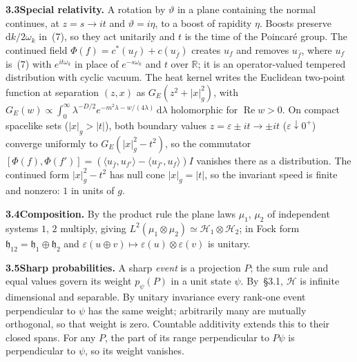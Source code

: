 \documentclass[10pt,a4paper]{article}
\newcommand{\dd}{\mathrm{d}}
\newcommand{\R}{\mathbb{R}}
\newcommand{\hh}{\mathfrak{h}}
\newcommand{\HH}{\mathcal{H}}
\newcommand{\RePart}{\operatorname{Re}}
\begin{document}
\newpage
\setlength{\intextsep}{7pt plus 2pt minus 2pt}
\noindent\textbf{3.3\enspace Special relativity.} A rotation by $\vartheta$ in a plane containing the normal continues, at $z = s \to it$ and $\vartheta = i\eta$, to a boost of rapidity $\eta$. Boosts preserve $\dd k/2\omega_k$ in~(7), so they act unitarily and $t$ is the time of the Poincar\'e group. The continued field $\Phi(f) = c^*(u_f) + c(u_{\bar{f}})$ creates $u_f$ and removes $u_{\bar{f}}$, where $u_f$ is~(7) with $e^{it\omega_k}$ in place of $e^{-s\omega_k}$ and $t$ over $\R$; it is an operator-valued tempered distribution with cyclic vacuum. The heat kernel writes the Euclidean two-point function at separation $(z, x)$ as $G_E(z^2 + |x|_g^2)$, with $G_E(w) \propto \int_0^\infty \lambda^{-D/2} e^{-m^2\lambda - w/(4\lambda)}\,\dd\lambda$ holomorphic for $\RePart w > 0$. On compact spacelike sets ($|x|_g > |t|$), both boundary values $z = \varepsilon \pm it \to \pm it$ ($\varepsilon \downarrow 0^+$) converge uniformly to $G_E(|x|_g^2 - t^2)$, so the commutator $[\Phi(f), \Phi(f')] = (\langle u_{\bar{f}}, u_{f'}\rangle - \langle u_{\bar{f}'}, u_f\rangle)I$ vanishes there as a distribution. The continued form $|x|_g^2 - t^2$ has null cone $|x|_g = |t|$, so the invariant speed is finite and nonzero: $1$ in units of $g$.

\vspace{1.5pt}
\noindent\textbf{3.4\enspace Composition.} By the product rule the plane laws $\mu_1$, $\mu_2$ of independent systems $1$, $2$ multiply, giving $L^2(\mu_1 \otimes \mu_2) \simeq \HH_1 \otimes \HH_2$; in Fock form $\hh_{12} = \hh_1 \oplus \hh_2$ and $\varepsilon(u \oplus v) \mapsto \varepsilon(u) \otimes \varepsilon(v)$ is unitary.

\vspace{1.5pt}
\noindent\textbf{3.5\enspace Sharp probabilities.} A sharp \textit{event} is a projection $P$; the sum rule and equal values govern its weight $p_\psi(P)$ in a unit state $\psi$. By~\S3.1, $\HH$ is infinite dimensional and separable. By unitary invariance every rank-one event perpendicular to $\psi$ has the same weight; arbitrarily many are mutually orthogonal, so that weight is zero. Countable additivity extends this to their closed spans. For any $P$, the part of its range perpendicular to $P\psi$ is perpendicular to $\psi$, so its weight vanishes.
\end{document}
